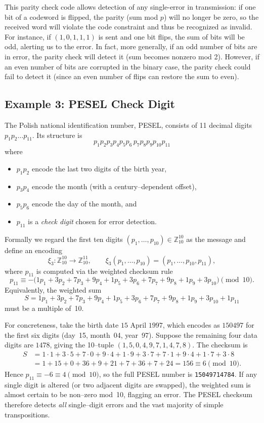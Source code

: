 \documentclass[docmute]{article}
\begin{document}
This parity check code allows detection of any single-error in transmission: if one bit of a codeword is flipped, the parity (sum mod $p$) will no longer be zero, so the received word will violate the code constraint and thus be recognized as invalid. For instance, if $(1,0,1,1,1)$ is sent and one bit flips, the sum of bits will be odd, alerting us to the error. In fact, more generally, if an odd number of bits are in error, the parity check will detect it (sum becomes nonzero mod 2). However, if an even number of bits are corrupted in the binary case, the parity check could fail to detect it (since an even number of flips can restore the sum to even).

\subsection*{Example 3: \textsc{PESEL} Check Digit}
The Polish national identification number, \textsc{PESEL}, consists of 11 decimal digits $p_1p_2\dots p_{11}$.  Its structure is
\[
  p_1p_2p_3p_4p_5p_6\,p_7p_8p_9p_{10}p_{11}
\]
where
\begin{itemize}
  \item $p_1p_2$ encode the last two digits of the birth year,
  \item $p_3p_4$ encode the month (with a century--dependent offset),
  \item $p_5p_6$ encode the day of the month, and
  \item $p_{11}$ is a \emph{check digit} chosen for error detection.
\end{itemize}

Formally we regard the first ten digits $(p_1,\dots,p_{10})\in\mathbb{Z}_{10}^{10}$ as the message and define an encoding
\[
  \xi_3: \mathbb{Z}_{10}^{10}\longrightarrow\mathbb{Z}_{10}^{11},\qquad \xi_3(p_1,\dots,p_{10})=(p_1,\dots,p_{10},p_{11}),
\]
where $p_{11}$ is computed via the weighted checksum rule
\[
  p_{11}\equiv -\bigl(1p_1+3p_2+7p_3+9p_4+1p_5+3p_6+7p_7+9p_8+1p_9+3p_{10}\bigr)\pmod{10}.
\]
Equivalently, the weighted sum
\[
   S=1p_1+3p_2+7p_3+9p_4+1p_5+3p_6+7p_7+9p_8+1p_9+3p_{10}+1p_{11}
\]
must be a multiple of~10.

\medskip

For concreteness, take the birth date $\text{15 April 1997}$, which encodes as $150497$ for the first six digits (day 15, month 04, year 97).  Suppose the remaining four data digits are $1478$, giving the 10--tuple $(1,5,0,4,9,7,1,4,7,8)$.  The checksum is
\[
\begin{aligned}
  S &=1\cdot1+3\cdot5+7\cdot0+9\cdot4+1\cdot9+3\cdot7+7\cdot1+9\cdot4+1\cdot7+3\cdot8\\
    &=1+15+0+36+9+21+7+36+7+24=156\equiv6\pmod{10}.
\end{aligned}
\]
Hence $p_{11}\equiv -6\equiv4\pmod{10}$, so the full PESEL number is \texttt{15049714784}.  If any single digit is altered (or two adjacent digits are swapped), the weighted sum is almost certain to be non--zero mod 10, flagging an error.  The PESEL checksum therefore detects \emph{all} single--digit errors and the vast majority of simple transpositions.
\end{document}
